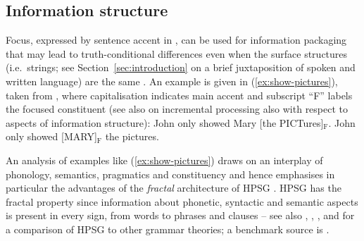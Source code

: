 \documentclass[output=paper
 	        ,biblatex
                ,babelshorthands
                ,newtxmath
                ,draftmode
                ,colorlinks, citecolor=brown
]{langscibook}
\begin{document}
\subsection{Information structure}
\label{sec:information-structure}

Focus, expressed by sentence accent in , can be used for information packaging that may lead to truth-conditional differences even when the surface structures (i.e.\ strings; see Section~\ref{sec:introduction} on a brief juxtaposition of spoken and written language) are the same \citep{Halliday:1967}.
%
An example is given in (\ref{ex:show-pictures}), taken from \citet[]{Krifka:2008}, where capitalisation indicates main accent and subscript \enquote{F} labels the focused constituent (see also  on incremental processing also with respect to aspects of information structure):
%
\ea \label{ex:show-pictures}
  \ea John only showed Mary [the PICTures]$_\text{F}$.
  \ex John only showed [MARY]$_\text{F}$ the pictures.
  \z
\z


An analysis of examples like (\ref{ex:show-pictures}) draws on an interplay of phonology, semantics, pragmatics and constituency and hence emphasises in particular the advantages of the \emph{fractal} architecture of HPSG \citep{Johnson:Lappin:1999}. 
%
HPSG has the fractal property since
information about phonetic, syntactic and semantic aspects is present in every sign, from words to phrases and clauses \citep[]{Pollard:Sag:1994} -- see also , , ,  and  for a comparison of HPSG to other grammar theories; a benchmark source is \citet{MuellerGT-Eng1}.
\end{document}
